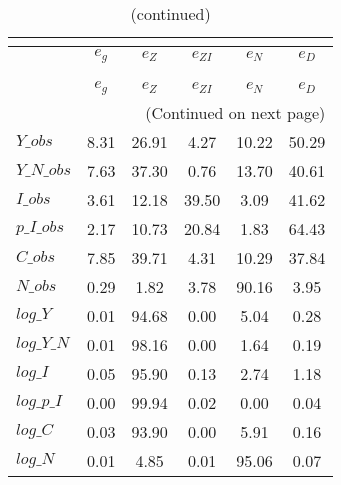  
\begin{center}
\begin{longtable}{lccccc} 
\caption{VARIANCE DECOMPOSITION (in percent)}\\
 \label{Table:th_var_decomp_uncond}\\
\toprule 
$           $	 & 	 $       {e_g}$	 & 	 $       {e_Z}$	 & 	 $    {e_{ZI}}$	 & 	 $       {e_N}$	 & 	 $       {e_D}$\\
\midrule \endfirsthead 
\caption{(continued)}\\
 \toprule \\ 
$           $	 & 	 $       {e_g}$	 & 	 $       {e_Z}$	 & 	 $    {e_{ZI}}$	 & 	 $       {e_N}$	 & 	 $       {e_D}$\\
\midrule \endhead 
\midrule \multicolumn{6}{r}{(Continued on next page)} \\ \bottomrule \endfoot 
\bottomrule \endlastfoot 
$Y\_obs     $	 & 	        8.31	 & 	       26.91	 & 	        4.27	 & 	       10.22	 & 	       50.29 \\ 
$Y\_N\_obs  $	 & 	        7.63	 & 	       37.30	 & 	        0.76	 & 	       13.70	 & 	       40.61 \\ 
$I\_obs     $	 & 	        3.61	 & 	       12.18	 & 	       39.50	 & 	        3.09	 & 	       41.62 \\ 
$p\_I\_obs  $	 & 	        2.17	 & 	       10.73	 & 	       20.84	 & 	        1.83	 & 	       64.43 \\ 
$C\_obs     $	 & 	        7.85	 & 	       39.71	 & 	        4.31	 & 	       10.29	 & 	       37.84 \\ 
$N\_obs     $	 & 	        0.29	 & 	        1.82	 & 	        3.78	 & 	       90.16	 & 	        3.95 \\ 
$log\_Y     $	 & 	        0.01	 & 	       94.68	 & 	        0.00	 & 	        5.04	 & 	        0.28 \\ 
$log\_Y\_N  $	 & 	        0.01	 & 	       98.16	 & 	        0.00	 & 	        1.64	 & 	        0.19 \\ 
$log\_I     $	 & 	        0.05	 & 	       95.90	 & 	        0.13	 & 	        2.74	 & 	        1.18 \\ 
$log\_p\_I  $	 & 	        0.00	 & 	       99.94	 & 	        0.02	 & 	        0.00	 & 	        0.04 \\ 
$log\_C     $	 & 	        0.03	 & 	       93.90	 & 	        0.00	 & 	        5.91	 & 	        0.16 \\ 
$log\_N     $	 & 	        0.01	 & 	        4.85	 & 	        0.01	 & 	       95.06	 & 	        0.07 \\ 
\end{longtable}
 \end{center}
